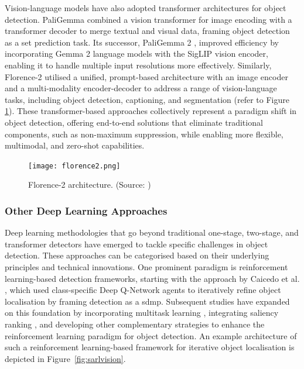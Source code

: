 Vision-language models have also adopted transformer architectures for object detection. PaliGemma \cite{paligemma} combined a vision transformer for image encoding with a transformer decoder to merge textual and visual data, framing object detection as a set prediction task. Its successor, PaliGemma 2 \cite{paligemma2}, improved efficiency by incorporating Gemma 2 language models with the SigLIP vision encoder, enabling it to handle multiple input resolutions more effectively. Similarly, Florence-2 \cite{florence2} utilised a unified, prompt-based architecture with an image encoder and a multi-modality encoder-decoder to address a range of vision-language tasks, including object detection, captioning, and segmentation (refer to Figure \ref{fig:florence2}).
These transformer-based approaches collectively represent a paradigm shift in object detection, offering end-to-end solutions that eliminate traditional components, such as non-maximum suppression, while enabling more flexible, multimodal, and zero-shot capabilities.

\begin{figure}[!htbp]
\centering
\texttt{[image: florence2.png]}
\caption{Florence-2 architecture. (Source: \cite{florence2})}
\label{fig:florence2}
\end{figure}

\subsubsection{Other Deep Learning Approaches}
\label{subsubsec:2_other_approaches}

Deep learning methodologies that go beyond traditional one-stage, two-stage, and transformer detectors have emerged to tackle specific challenges in object detection. These approaches can be categorised based on their underlying principles and technical innovations.
One prominent paradigm is reinforcement learning-based detection frameworks, starting with the approach by Caicedo et al. \cite{Caicedo_2015_ICCV}, which used class-specific Deep Q-Network agents to iteratively refine object localisation by framing detection as a \gls{sdmp}. Subsequent studies have expanded on this foundation by incorporating multitask learning \cite{multitask_learning}, integrating saliency ranking \cite{bartolo2024integratingsaliencyrankingreinforcement}, and developing other complementary strategies \cite{reinforcenet, bar_rl} to enhance the reinforcement learning paradigm for object detection. An example architecture of such a reinforcement learning-based framework for iterative object localisation is depicted in Figure~\ref{fig:sarlvision}.

